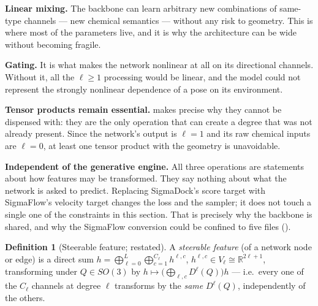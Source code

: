 \documentclass[11pt,a4paper]{report}
\theoremstyle{definition}
\newtheorem{definition}[definition]{Definition}
\theoremstyle{remark}
\newcommand{\RR}{\mathbb R}
\begin{document}
\begin{tcolorbox}[colback=blue!3,colframe=blue!40!black,title=Why this matters for SigmaFlow]
\textbf{Linear mixing.} The backbone can learn arbitrary new combinations of
same-type channels --- new chemical semantics --- without any risk to
geometry. This is where most of the parameters live, and it is why the
architecture can be wide without becoming fragile.

\textbf{Gating.} It is what makes the network nonlinear at all on its
directional channels. Without it, all the $\ell\ge1$ processing would be
linear, and the model could not represent the strongly nonlinear dependence
of a pose on its environment.

\textbf{Tensor products remain essential.}  makes
precise why they cannot be dispensed with: they are the only operation that
can create a degree that was not already present. Since the network's output
is $\ell=1$ and its raw chemical inputs are $\ell=0$, at least one tensor
product with the geometry is unavoidable.

\textbf{Independent of the generative engine.} All three operations are
statements about how features may be transformed. They say nothing about
what the network is asked to predict. Replacing SigmaDock's score target
with SigmaFlow's velocity target changes the loss and the sampler; it does
not touch a single one of the constraints in this section. That is precisely
why the backbone is shared, and why the SigmaFlow conversion could be
confined to five files ().
\end{tcolorbox}

\begin{definition}[Steerable feature; restated]
\label{def:steerable-scratch}
A \emph{steerable feature} (of a network node or edge) is a direct sum
$h=\bigoplus_{\ell=0}^L\bigoplus_{c=1}^{C_\ell}h^{\ell,c}$, $h^{\ell,c}\in V_\ell\cong\RR^{2\ell+1}$,
transforming under $Q\in SO(3)$ by $h\mapsto\bigl(\bigoplus_{\ell,c}D^\ell(Q)\bigr)h$
--- i.e.\ every one of the $C_\ell$ channels at degree $\ell$ transforms by
the \emph{same} $D^\ell(Q)$, independently of the others.
\end{definition}
\end{document}
